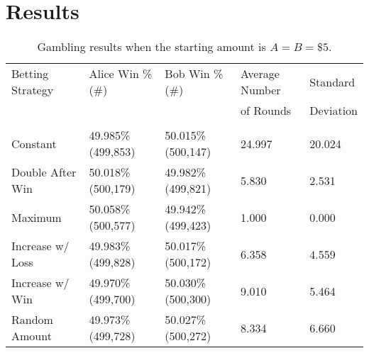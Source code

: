 \documentclass[12pt]{article}
\begin{document}
	\section{Results}
		\begin{table}[H]
			\begin{center}
				\begin{tabular}{l|l|l|l|l}
					Betting Strategy 	& Alice Win \% (\#) 	& Bob Win \% (\#)		& Average Number 	& Standard  	\\
										&						&						& of Rounds 		& Deviation				\\
					\hline
					\vspace{ -0.15in }	&						&						&					&	\\
					Constant 			& 49.985\% (499,853)	& 50.015\% (500,147)	& 24.997			& 20.024	\\
					Double After Win	& 50.018\% (500,179)	& 49.982\% (499,821)	& 5.830				& 2.531	\\
					Maximum				& 50.058\% (500,577)	& 49.942\% (499,423)	& 1.000				& 0.000	\\
					Increase w/ Loss 	& 49.983\% (499,828)	& 50.017\% (500,172)	& 6.358				& 4.559	\\
					Increase w/ Win		& 49.970\% (499,700)	& 50.030\% (500,300)	& 9.010				& 5.464	\\
					Random Amount 		& 49.973\% (499,728)	& 50.027\% (500,272)	& 8.334				& 6.660	\\
				\end{tabular}
				\caption{Gambling results when the starting amount is $A = B = \$5$.}
				\label{tab:a-b}
			\end{center}
		\end{table}
\end{document}
